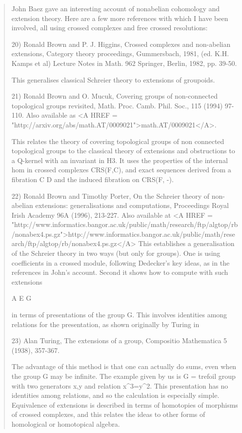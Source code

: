 \begin{quote}
 John Baez gave an interesting account of nonabelian cohomology and
 extension theory.  Here are a few more references with which I have been
 involved, all using crossed complexes and free crossed resolutions:

20) 
 Ronald Brown and P. J. Higgins, Crossed complexes and non-abelian
 extensions, Category theory proceedings, Gummersbach,
 1981, (ed. K.H. Kamps et al) Lecture Notes in Math. 962 
 Springer, Berlin, 1982, pp. 39-50.

 This generalises classical Schreier theory to extensions of groupoids.

21)
Ronald Brown and O. Mucuk, 
Covering groups of non-connected 
 topological groups revisited, Math. Proc. Camb. Phil. 
 Soc., 115 (1994) 97-110.  Also available as 
 <A HREF = "http://arxiv.org/abs/math.AT/0009021">math.AT/0009021</A>.

 This relates the theory of covering topological groups of non connected
 topological groups to the classical theory of extensions and
 obstructions to a Q-kernel with an invariant in H3.  It uses the
 properties of the internal hom in crossed complexes CRS(F,C), and 
 exact sequences derived from a fibration C \to  D and the induced 
 fibration on CRS(F, -).

22) 
Ronald Brown and Timothy Porter,
On the Schreier theory of non-abelian
 extensions: generalisations and computations, Proceedings
 Royal Irish Academy 96A (1996), 213-227.
Also available at
<A HREF = "http://www.informatics.bangor.ac.uk/public/math/research/ftp/algtop/rb/nonabex4.ps.gz">http://www.informatics.bangor.ac.uk/public/math/research/ftp/algtop/rb/nonabex4.ps.gz</A>
 This establishes a generalisation of the Schreier theory in two ways 
 (but only for groups). One is using coefficients in a crossed module,
 following Dedecker's key ideas, as in the references in John's account.
 Second it shows how to compute with such extensions

 A \to  E \to  G

 in terms of presentations of the group G.  This involves identities
 among relations for the presentation, as shown originally by Turing in

23) 
 Alan Turing, The extensions of a group, Compositio Mathematica 5 (1938), 
 357-367.

 The advantage of this method is that one can actually do sums, even when
 the group G may be infinite.  The example given by us is G = trefoil group
 with two generators x,y and relation x^{3}=y^{2}. 
 This presentation has no
 identities among relations, and so the calculation is especially simple.
 Equivalence of extensions is described in terms of homotopies of
 morphisms of crossed complexes, and this relates the ideas to other
 forms of homological or homotopical algebra.


\end{quote}

